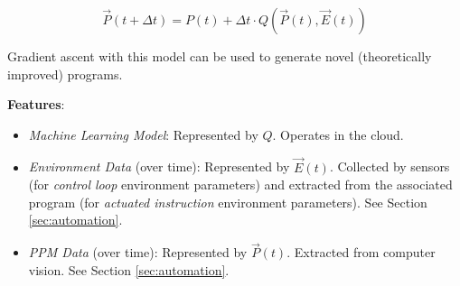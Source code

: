$$\vec P(t+\Delta t)=P(t)+\Delta t\cdot Q(\vec P(t),\vec E(t))$$

Gradient ascent with this model can be used to generate novel (theoretically improved) programs.

\textbf{Features}:
\begin{itemize}
    \item \textit{Machine Learning Model}: Represented by $Q$. Operates in the cloud.
    \item \textit{Environment Data} (over time): Represented by $\vec E(t)$. Collected by sensors (for \textit{control loop} environment parameters) and extracted from the associated program (for \textit{actuated instruction} environment parameters). See Section \ref{sec:automation}.
    \item \textit{PPM Data} (over time): Represented by $\vec P(t)$. Extracted from computer vision. See Section \ref{sec:automation}.
\end{itemize}